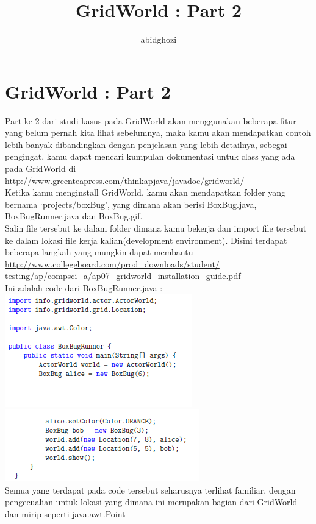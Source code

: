\documentclass{article}
\title{GridWorld : Part 2}
\author{abidghozi}
\begin{document}
	\newpage
	
	\section*{GridWorld : Part 2}
	Part ke 2 dari studi kasus pada GridWorld akan menggunakan beberapa fitur yang belum pernah kita lihat sebelumnya, maka kamu akan mendapatkan contoh lebih banyak dibandingkan dengan penjelasan yang lebih detailnya, sebegai pengingat, kamu dapat mencari kumpulan dokumentasi untuk class yang ada pada GridWorld di 
	\url{http://www.greenteapress.com/thinkapjava/javadoc/gridworld/}
	\\
	
	Ketika kamu menginstall GridWorld, kamu akan mendapatkan folder yang bernama ‘projects/boxBug’, yang dimana akan berisi BoxBug.java, BoxBugRunner.java dan BoxBug.gif.
	\\
	
	Salin file tersebut ke dalam folder dimana kamu bekerja dan import file tersebut ke dalam lokasi file kerja kalian(development environment). Disini terdapat beberapa langkah yang mungkin dapat membantu \url{http://www.collegeboard.com/prod_downloads/student/
	testing/ap/compsci_a/ap07_gridworld_installation_guide.pdf}
	\\
	
	Ini adalah code dari BoxBugRunner.java :
	\\
	\includegraphics{A1}
	\\
	\includegraphics{A2}
	\\
	
	Semua yang terdapat pada code tersebut seharusnya terlihat familiar, dengan pengecualian untuk lokasi yang dimana ini merupakan bagian dari GridWorld dan mirip seperti java.awt.Point
	\newpage
	
\end{document}
